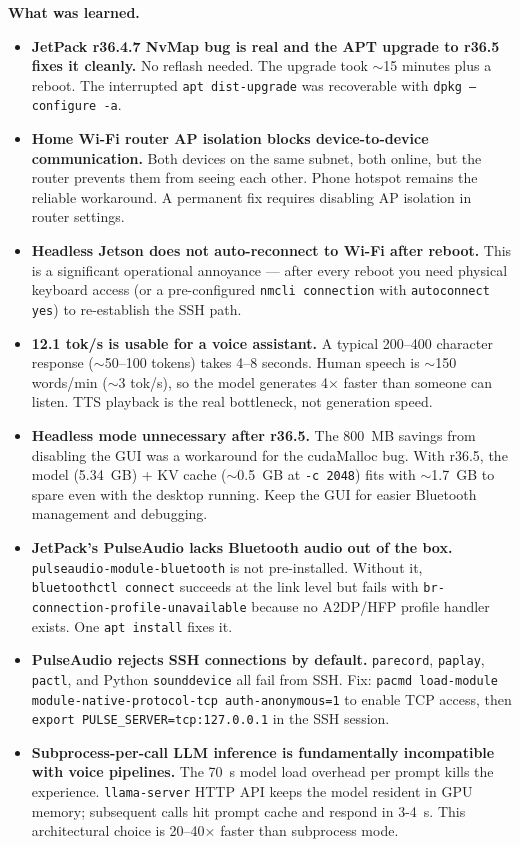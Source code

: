 \documentclass{article}
\theoremstyle{plain}
\theoremstyle{definition}
\theoremstyle{remark}
\begin{document}
\textbf{What was learned.}
\begin{itemize}
\item \textbf{JetPack r36.4.7 NvMap bug is real and the APT upgrade to r36.5 fixes it cleanly.} No reflash needed. The upgrade took $\sim$15 minutes plus a reboot. The interrupted \texttt{apt dist-upgrade} was recoverable with \texttt{dpkg --configure -a}.
\item \textbf{Home Wi-Fi router AP isolation blocks device-to-device communication.} Both devices on the same subnet, both online, but the router prevents them from seeing each other. Phone hotspot remains the reliable workaround. A permanent fix requires disabling AP isolation in router settings.
\item \textbf{Headless Jetson does not auto-reconnect to Wi-Fi after reboot.} This is a significant operational annoyance --- after every reboot you need physical keyboard access (or a pre-configured \texttt{nmcli connection} with \texttt{autoconnect yes}) to re-establish the SSH path.
\item \textbf{12.1 tok/s is usable for a voice assistant.} A typical 200--400 character response ($\sim$50--100 tokens) takes 4--8 seconds. Human speech is $\sim$150 words/min ($\sim$3 tok/s), so the model generates 4$\times$ faster than someone can listen. TTS playback is the real bottleneck, not generation speed.
\item \textbf{Headless mode unnecessary after r36.5.} The 800~MB savings from disabling the GUI was a workaround for the cudaMalloc bug. With r36.5, the model (5.34~GB) + KV cache ($\sim$0.5~GB at \texttt{-c 2048}) fits with $\sim$1.7~GB to spare even with the desktop running. Keep the GUI for easier Bluetooth management and debugging.
\item \textbf{JetPack's PulseAudio lacks Bluetooth audio out of the box.} \texttt{pulseaudio-module-bluetooth} is not pre-installed. Without it, \texttt{bluetoothctl connect} succeeds at the link level but fails with \texttt{br-connection-profile-unavailable} because no A2DP/HFP profile handler exists. One \texttt{apt install} fixes it.
\item \textbf{PulseAudio rejects SSH connections by default.} \texttt{parecord}, \texttt{paplay}, \texttt{pactl}, and Python \texttt{sounddevice} all fail from SSH. Fix: \texttt{pacmd load-module module-native-protocol-tcp auth-anonymous=1} to enable TCP access, then \texttt{export PULSE\_SERVER=tcp:127.0.0.1} in the SSH session.
\item \textbf{Subprocess-per-call LLM inference is fundamentally incompatible with voice pipelines.} The 70~s model load overhead per prompt kills the experience. \texttt{llama-server} HTTP API keeps the model resident in GPU memory; subsequent calls hit prompt cache and respond in 3-4~s. This architectural choice is 20--40$\times$ faster than subprocess mode.

\end{itemize}
\end{document}
